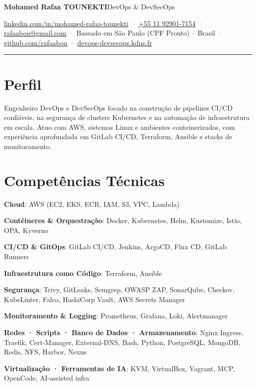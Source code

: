 \documentclass[10pt,a4paper]{article}
\begin{document}
{\LARGE\bfseries Mohamed Rafaa TOUNEKTI}\hfill{\small DevOps \& DevSecOps}\par
\vspace{3pt}
{\footnotesize \href{https://linkedin.com/in/mohamed-rafaa-tounekti}{linkedin.com/in/mohamed-rafaa-tounekti} \textcolor{graytext}{·} \href{tel:+5511929017154}{+55 11 92901-7154} \textcolor{graytext}{·} \href{mailto:rafaabou@gmail.com}{rafaabou@gmail.com} \textcolor{graytext}{·} Baseado em São Paulo (CPF Pronto) – Brasil \textcolor{graytext}{·} \href{https://github.com/rafaabou}{github.com/rafaabou} \textcolor{graytext}{·} \href{https://devops-devsecops.kdns.fr/}{devops-devsecops.kdns.fr}}\par
\vspace{2pt}\hrule\vspace{2pt}
\section*{Perfil}
Engenheiro DevOps e DevSecOps focado na construção de pipelines CI/CD confiáveis, na segurança de clusters Kubernetes e na automação de infraestrutura em escala. Atuo com AWS, sistemas Linux e ambientes conteinerizados, com experiência aprofundada em GitLab CI/CD, Terraform, Ansible e stacks de monitoramento.\par
\section*{Competências Técnicas}
\textbf{Cloud}: AWS (EC2, EKS, ECR, IAM, S3, VPC, Lambda)\par
\textbf{Contêineres \& Orquestração}: Docker, Kubernetes, Helm, Kustomize, Istio, OPA, Kyverno\par
\textbf{CI/CD \& GitOps}: GitLab CI/CD, Jenkins, ArgoCD, Flux CD, GitLab Runners\par
\textbf{Infraestrutura como Código}: Terraform, Ansible\par
\textbf{Segurança}: Trivy, GitLeaks, Semgrep, OWASP ZAP, SonarQube, Checkov, KubeLinter, Falco, HashiCorp Vault, AWS Secrets Manager\par
\textbf{Monitoramento \& Logging}: Prometheus, Grafana, Loki, Alertmanager\par
\textbf{Redes · Scripts · Banco de Dados · Armazenamento}: Nginx Ingress, Traefik, Cert-Manager, External-DNS, Bash, Python, PostgreSQL, MongoDB, Redis, NFS, Harbor, Nexus\par
\textbf{Virtualização · Ferramentas de IA}: KVM, VirtualBox, Vagrant, MCP, OpenCode, AI-assisted infra\par
\end{document}
